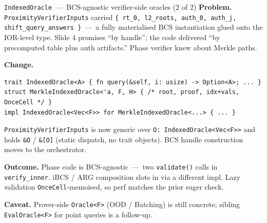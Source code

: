 \documentclass[10pt,aspectratio=169]{beamer}
\begin{document}
\begin{frame}[fragile]{\texttt{IndexedOracle} \,---\, BCS-agnostic verifier-side oracles (2 of 2)}
\small
\textbf{Problem.}\;
\texttt{ProximityVerifierInputs} carried \texttt{\{ rt\_0, l2\_roots, auth\_0, auth\_j, shift\_query\_answers \}} \,---\, a fully materialised BCS instantiation glued onto the IOR-level type. Slide 4 promises ``by handle''; the code delivered ``by precomputed table plus auth artifacts.'' Phase verifier knew about Merkle paths.

\vspace{0.3em}
\textbf{Change.}
\begin{lstlisting}
trait IndexedOracle<A> { fn query(&self, i: usize) -> Option<A>; ... }
struct MerkleIndexedOracle<'a, F, H> { /* root, proof, idx+vals, OnceCell */ }
impl IndexedOracle<Vec<F>> for MerkleIndexedOracle<...> { ... }
\end{lstlisting}
\texttt{ProximityVerifierInputs} is now generic over \texttt{O: IndexedOracle<Vec<F>>} and holds \texttt{\&O} / \texttt{\&[O]} (static dispatch, no trait objects). BCS handle construction moves to the orchestrator.

\vspace{0.3em}
\textbf{Outcome.} Phase code is BCS-agnostic \,---\, two \texttt{validate()} calls in \texttt{verify\_inner}. iBCS / ARG composition slots in via a different impl. Lazy validation \texttt{OnceCell}-memoised, so perf matches the prior eager check.

\vspace{0.3em}
\textbf{Caveat.} Prover-side \texttt{Oracle<F>} (OOD / Batching) is still concrete; sibling \texttt{EvalOracle<F>} for point queries is a follow-up.
\end{frame}
\end{document}
